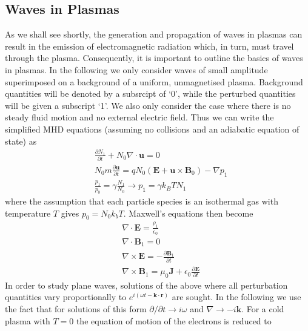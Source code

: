 \subsection{Waves in Plasmas}
As we shall see shortly, the generation and propagation of waves in plasmas can result in the emission of electromagnetic radiation which, in turn, must travel through the plasma. Consequently, it is important to outline the basics of waves in plasmas. In the following we only consider waves of small amplitude superimposed on a background of a uniform, unmagnetised plasma. Background quantities will be denoted by a subsrcipt of `0', while the perturbed quantities will be given a  subscript `1'. We also only consider the case where there is no steady fluid motion and no external electric field. Thus we can write the simplified MHD equations (assuming no collisions and an adiabatic equation of state) as
\begin{subequations} \label{eq:MHDwaves_simplified}
\begin{align}
& \frac{\partial N_1}{\partial t} + N_0 \nabla \cdot \mathbf{u} = 0 \\
& N_0 m \frac{\partial \mathbf{u}}{\partial t} = q N_0 (\mathbf{E} + \mathbf{u} \times \mathbf{B}_0) - \nabla p_1 \\
& \frac{p_1}{p_0} = \gamma \frac{N_1}{N_0} \rightarrow p_1 = \gamma k_B T N_1 
\end{align}
\end{subequations}
where the assumption that each particle species is an isothermal gas with temperature $T$ gives $p_0 = N_0 k_b T$. Maxwell's equations then become
\begin{subequations} \label{eq:MHDwaves_Maxwell}
\begin{align}
& \nabla \cdot \mathbf{E} = \frac{\rho_1}{\epsilon_0} \\
& \nabla \cdot \mathbf{B}_1 = 0 \\
& \nabla \times \mathbf{E} = - \frac{\partial \mathbf{B}_1}{\partial t} \\
& \nabla \times \mathbf{B}_1 = \mu_0 \mathbf{J} + \epsilon_0 \frac{\partial \mathbf{E}}{\partial t}
\end{align}
\end{subequations}
In order to study plane waves, solutions of the above where all perturbation quantities vary proportionally to  $e^{i(\omega t - \mathbf{k} \cdot \mathbf{r})}$ are sought. In the following we use the fact that for solutions of this form $\partial / \partial t \rightarrow i \omega$ and $\nabla \rightarrow -i \mathbf{k}$.  For a cold plasma with $T=0$ the equation of motion of the electrons is reduced to 
